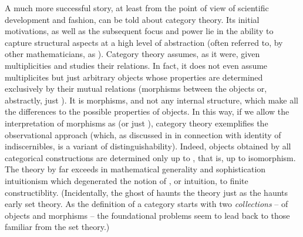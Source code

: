 \pa\label{pa:categories} A much more successful story, at least from the point
of view of scientific development and fashion, can be told about category
theory.  Its
initial motivations, as well as the subsequent focus and power lie in the
ability to capture structural aspects at a high level of abstraction (often
referred to, by other mathematicians, as ).
Category theory assumes, as it were, given multiplicities and studies their
relations. In fact, it does not even assume multiplicites but just arbitrary
objects whose properties are determined exclusively by their mutual relations
(morphisms between the objects or, abstractly, just ). It is
morphisms, and not any internal structure, which make all the differences to the
possible properties of objects. In this way, if we allow the interpretation of
morphisms as  (or just ), category
theory exemplifies the observational approach (which, as discussed in
 in connection with identity of indiscernibles, is a
variant of distinguishability).  Indeed, objects obtained by all categorical
constructions are determined only up to , that is, up
to isomorphism.  The theory by far exceeds in
mathematical generality and sophistication intuitionism which degenerated the
notion of , or intuition, to finite
constructiblity.  (Incidentally, the ghost of
 haunts the theory just as the  haunts early set theory. As the definition of a category starts with 
two {\em collections} -- of objects and morphisms -- the foundational problems seem
to lead back to those familiar from the set theory.)



